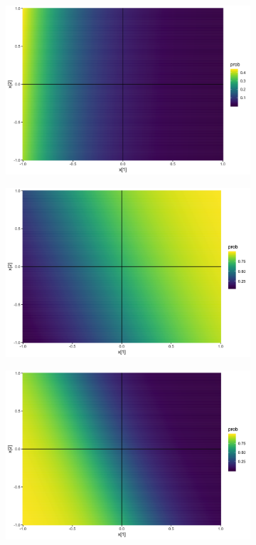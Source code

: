 \documentclass[10pt,mathserif]{beamer}
\begin{document}
\begin{frame}
\begin{figure}
\begin{subfigure}{.1\textwidth}
    \end{subfigure}
    \begin{subfigure}{.1\textwidth}
      \centering
      \includegraphics[width=0.1\paperwidth]{figure/sigmoid_plot_6}
    \end{subfigure}
    \begin{subfigure}{.1\textwidth}
      \centering
      \includegraphics[width=0.1\paperwidth]{figure/sigmoid_plot_7}
    \end{subfigure}
    \begin{subfigure}{.1\textwidth}
      \centering
      \includegraphics[width=0.1\paperwidth]{figure/sigmoid_plot_8}

\end{subfigure}
\end{figure}
\end{frame}
\end{document}
